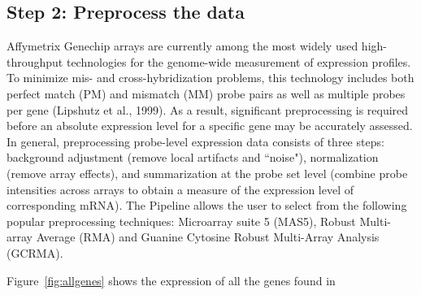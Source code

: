 
\subsection*{Step 2: Preprocess the data}

\par Affymetrix Genechip arrays are currently among the most widely used high-throughput technologies for the genome-wide measurement of expression profiles. To minimize mis- and cross-hybridization problems, this technology includes both perfect match (PM) and mismatch (MM) probe pairs as well as multiple probes per gene (Lipshutz et al., 1999). As a result, significant preprocessing is required before an absolute expression level for a specific gene may be accurately assessed. In general, preprocessing probe-level expression data consists of three steps: background adjustment (remove local artifacts and ``noise"), normalization (remove array effects), and summarization at the probe set level (combine probe intensities across arrays to obtain a measure of the expression level of corresponding mRNA). The Pipeline allows the user to select from the following popular preprocessing techniques: Microarray suite 5 (MAS5), Robust Multi-array Average (RMA) and Guanine Cytosine Robust Multi-Array Analysis (GCRMA).

\par Figure~\ref{fig:allgenes} shows the expression of all the genes found in 
